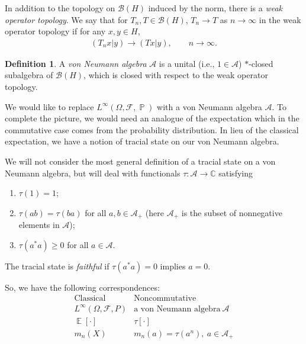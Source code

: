 \documentclass[letterpaper,11pt,oneside,reqno]{amsart}
\numberwithin{equation}{section}
\DeclareMathOperator{\EE}{\mathbb{E}}
\DeclareMathOperator{\PP}{\mathbb{P}}
\theoremstyle{definition}
\newtheorem{definition}[proposition]{Definition}
\begin{document}
In addition to the topology on $\mathcal{B}(H)$ induced by the norm, there is a \emph{weak operator topology}. We say that for $T_n, T\in \mathcal{B}(H)$, $T_n\to T$ as $n\to\infty$
in the weak operator topology if for any $x,y\in H$,
\begin{align*}
    (T_nx|y)\to (Tx|y),\qquad n\to\infty.
\end{align*}
\begin{definition}
	A \emph{von Neumann algebra} $\mathcal{A}$
	is a unital (i.e., $1\in\mathcal{A}$) $*$-closed subalgebra 
	of $\mathcal{B}(H)$, which is closed with respect to the weak operator topology.
\end{definition}
We would
like to replace $L^\infty(\Omega, \mathcal{F}, \PP)$ with a von Neumann algebra $\mathcal{A}$.
To complete the picture, we would need an analogue of the expectation
which in the commutative case comes from the probability distribution.
In lieu of the classical expectation, we have a notion of tracial state on our von Neumann algebra. 

We will not consider the most general definition of a tracial state on a
von Neumann algebra, but will deal with functionals
$\tau\colon \mathcal{A}\to\mathbb{C}$ satisfying
\begin{enumerate}
    \item $\tau(1)=1$;
    \item $\tau(ab)=\tau(ba)$ for all $a,b\in\mathcal{A}_+$ (here $\mathcal{A}_+$
    is the subset of nonnegative elements in $\mathcal{A}$);
    \item $\tau(a^*a)\ge0$ for all $a\in\mathcal{A}$.
\end{enumerate}
The tracial state is \emph{faithful} if $\tau(a^*a)=0$ implies $a=0$.

So, we have the following correspondences:
\begin{equation*}
\begin{array}{c|c}
    \text{Classical} & \text{Noncommutative} \\ \hline
     L^\infty(\Omega, \mathcal{F}, P) & \text{a von Neumann algebra} \ \mathcal{A}\\
     \EE[\cdot] & \tau[\cdot]\\
     m_n(X) & m_n(a)=\tau(a^n),\ a\in \mathcal{A}_+
\end{array}	
\end{equation*}
\end{document}
